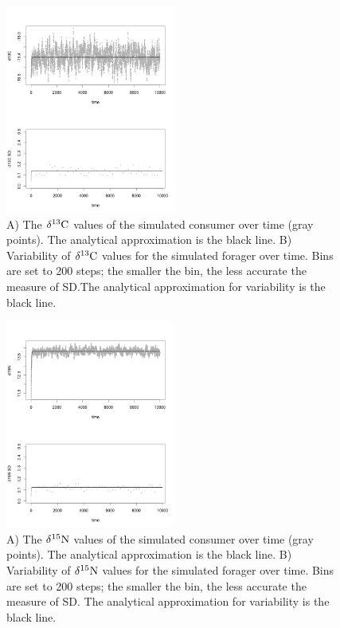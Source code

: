 \documentclass[11pt]{article}
\begin{document}
\begin{figure}[h!]
   \centering
   \includegraphics[width=0.5\textwidth]{fig_d13CvsTime.png}
      \caption{
      A) The $\delta^{13}{\rm C}$ values of the simulated consumer over time (gray points). The analytical approximation is the black line.
      B) Variability of $\delta^{13}{\rm C}$ values for the simulated forager over time. Bins are set to 200 steps; the smaller the bin, the less accurate the measure of SD.The analytical approximation for variability is the black line.
      }
      \label{fig_time}
\end{figure}

\begin{figure}[h!]
   \centering
   \includegraphics[width=0.5\textwidth]{fig_d15NvsTime.png}
      \caption{
      A) The $\delta^{15}{\rm N}$ values of the simulated consumer over time (gray points). The analytical approximation is the black line.
      B) Variability of $\delta^{15}{\rm N}$ values for the simulated forager over time. Bins are set to 200 steps; the smaller the bin, the less accurate the measure of SD. The analytical approximation for variability is the black line.
      }
      \label{fig_time}
\end{figure}
\end{document}
